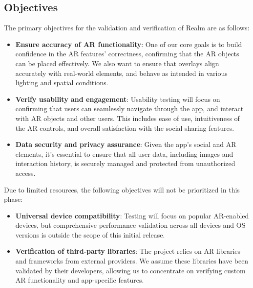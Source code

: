 \documentclass[12pt, titlepage]{article}
\begin{document}
\subsection{Objectives}

The primary objectives for the validation and verification of Realm are as follows: \\

\begin{itemize}
  \item \textbf{Ensure accuracy of AR functionality}: One of our core goals is to build confidence in the AR features' correctness, confirming that the AR objects can be placed effectively. We also want to ensure that overlays align accurately with real-world elements, and behave as intended in various lighting and spatial conditions. \\

  \item \textbf{Verify usability and engagement}: Usability testing will focus on confirming that users can seamlessly navigate through the app, and interact with AR objects and other users. This includes ease of use, intuitiveness of the AR controls, and overall satisfaction with the social sharing features. \\

  \item \textbf{Data security and privacy assurance}: Given the app's social and AR elements, it's essential to ensure that all user data, including images and interaction history, is securely managed and protected from unauthorized access. \\
\end{itemize}

Due to limited resources, the following objectives will not be prioritized in this phase: \\

\begin{itemize}
  \item \textbf{Universal device compatibility}: Testing will focus on popular AR-enabled devices, but comprehensive performance validation across all devices and OS versions is outside the scope of this initial release. \\

  \item \textbf{Verification of third-party libraries}: The project relies on AR libraries and frameworks from external providers. We assume these libraries have been validated by their developers, allowing us to concentrate on verifying custom AR functionality and app-specific features. \\
\end{itemize}
\end{document}
